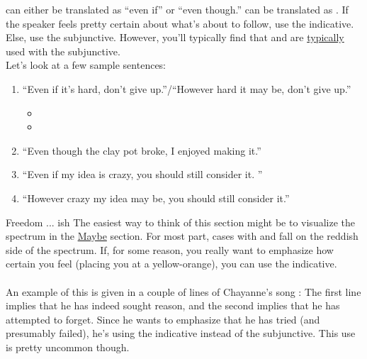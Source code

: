  can either be translated as ``even if'' or ``even though.''  can be translated as . If the speaker feels pretty certain about what's about to follow, use the indicative. Else, use the subjunctive. However, you'll typically find that  and  are \underline{typically} used with the subjunctive. \\

Let's look at a few sample sentences: 
\begin{enumerate}[noitemsep]
	\item ``Even if it's hard, don't give up.''/``However hard it may be, don't give up.'' \arr
		\begin{itemize}[noitemsep]
			\item {}
			\item {}
		\end{itemize}
	\item ``Even though the clay pot broke, I enjoyed making it.'' \arr {}
	\item ``Even if my idea is crazy, you should still consider it. '' \arr {}
	\item ``However crazy my idea may be, you should still consider it.'' \arr {}

\end{enumerate}

\begin{conf}{Freedom ... ish}
	The easiest way to think of this section might be to visualize the spectrum in the \hyperref[sec:maybe]{Maybe} section. For most part, cases with  and  fall on the reddish side of the spectrum. If, for some reason, you really want to emphasize how certain you feel (placing you at a yellow-orange), you can use the indicative. \\
	
	\\An example of this is given in a couple of lines of Chayanne's song :   The first line implies that he has indeed sought reason, and the second implies that he has attempted to forget. Since he wants to emphasize that he has tried (and presumably failed), he's using the indicative instead of the subjunctive. This use is pretty uncommon though. 
\end{conf}
